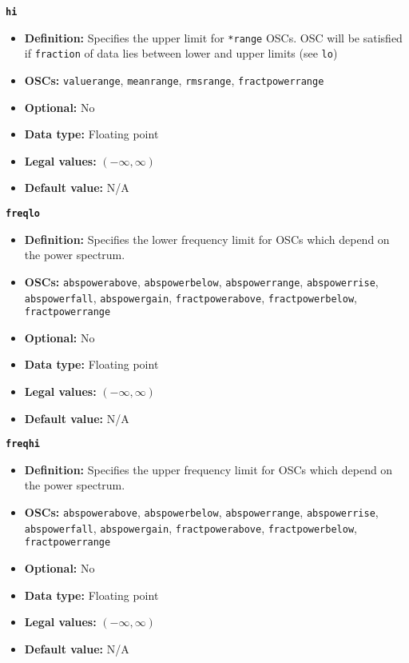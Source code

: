 \documentclass[11pt]{article}
\begin{document}
{\large\texttt{\textbf{hi}}}
\begin{itemize}
\item \textbf{Definition:} Specifies the upper limit for \texttt{*range}
  OSCs.  OSC will be satisfied if \texttt{fraction} of data lies between
  lower and upper limits (see \texttt{lo})
\item \textbf{OSCs:} \texttt{valuerange}, \texttt{meanrange},
  \texttt{rmsrange}, \texttt{fractpowerrange}  
\item \textbf{Optional:} No
\item \textbf{Data type:} Floating point
\item \textbf{Legal values:} $(-\infty, \infty)$
\item \textbf{Default value:} N/A  
\end{itemize}

{\large\texttt{\textbf{freqlo}}}
\begin{itemize}
\item \textbf{Definition:} Specifies the lower frequency limit for OSCs
  which depend on the power spectrum.
\item \textbf{OSCs:} \texttt{abspowerabove}, \texttt{abspowerbelow}, 
  \texttt{abspowerrange}, 
  \texttt{abspowerrise}, 
  \texttt{abspowerfall},
  \texttt{abspowergain},
  \texttt{fractpowerabove},
  \texttt{fractpowerbelow}, \texttt{fractpowerrange} 
\item \textbf{Optional:} No
\item \textbf{Data type:} Floating point
\item \textbf{Legal values:} $(-\infty, \infty)$
\item \textbf{Default value:} N/A
\end{itemize}

{\large\texttt{\textbf{freqhi}}}
\begin{itemize}
\item \textbf{Definition:} Specifies the upper frequency limit for OSCs
  which depend on the power spectrum.
\item \textbf{OSCs:} \texttt{abspowerabove}, \texttt{abspowerbelow}, 
  \texttt{abspowerrange}, 
  \texttt{abspowerrise},
  \texttt{abspowerfall},
  \texttt{abspowergain},
  \texttt{fractpowerabove}, 
  \texttt{fractpowerbelow}, \texttt{fractpowerrange} 
\item \textbf{Optional:} No
\item \textbf{Data type:} Floating point
\item \textbf{Legal values:} $(-\infty, \infty)$
\item \textbf{Default value:} N/A
\end{itemize}
\end{document}
